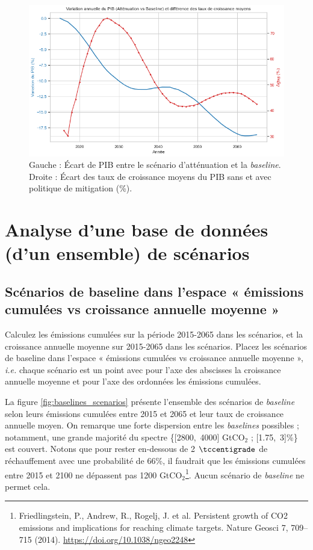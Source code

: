 \documentclass[a4,11pt]{aleph-notas}
\newcommand{\ans}[1]{
\begin{mdframed}[
    roundcorner=10pt,     %
    backgroundcolor=gray!20, %
    linecolor=black,      %
    linewidth=1pt,        %
    innertopmargin=10pt,  %
    innerbottommargin=10pt, %
    innerleftmargin=10pt,  %
    innerrightmargin=10pt  %
]
#1
\end{mdframed}
}
\begin{document}
\begin{enumerate}
\end{enumerate}

\begin{figure}[H]
    \centering
    \includegraphics[width=\textwidth]{images_IMACLIM/variation_PIB.png}
    \caption{Gauche : Écart de PIB entre le scénario d'atténuation et la \textit{baseline}. Droite : Écart des taux de croissance moyens du PIB sans et avec politique de mitigation (\%).}
    \label{fig:variation_PIB}
\end{figure}

\vspace{0.3cm}
\section{{Analyse d’une base de données (d’un ensemble) de scénarios}}
\vspace{0.3cm}

\subsection{Scénarios de baseline dans l’espace « émissions cumulées vs croissance annuelle moyenne »}

\ans{Calculez les émissions cumulées sur la période 2015-2065 dans les scénarios, et la croissance annuelle moyenne sur 2015-2065 dans les scénarios. Placez les scénarios de baseline dans l’espace « émissions cumulées vs croissance annuelle moyenne », \textit{i.e.} chaque scénario est un point avec pour l’axe des abscisses la croissance annuelle moyenne et pour l’axe des ordonnées les émissions cumulées.}

La figure \ref{fig:baselines_scenarios} présente l'ensemble des scénarios de \textit{baseline} selon leurs émissions cumulées entre 2015 et 2065 et leur taux de croissance annuelle moyen. On remarque une forte dispersion entre les \textit{baselines} possibles ; notamment, une grande majorité du spectre \{[2800,~4000] GtCO$_2$ ; [1.75,~3]\%\} est couvert. Notons que pour rester en-dessous de 2 $\tccentigrade$ de réchauffement avec une probabilité de 66\%, il faudrait que les émissions cumulées entre 2015 et 2100 ne dépassent pas 1200 GtCO$_2$\footnote{Friedlingstein, P., Andrew, R., Rogelj, J. et al. Persistent growth of CO2 emissions and implications for reaching climate targets. Nature Geosci 7, 709–715 (2014). \url{https://doi.org/10.1038/ngeo2248}}. Aucun scénario de \textit{baseline} ne permet cela.
\end{document}
